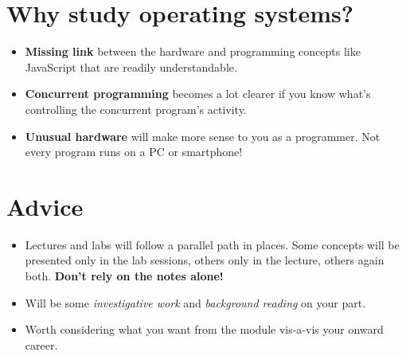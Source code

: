 \section{Why study operating systems?}
\label{sec:why-study-operating-systems}

\begin{itemize}

\item
  \textbf{Missing link} between the hardware and programming concepts
  like JavaScript that are readily understandable.
\item
  \textbf{Concurrent programming} becomes a lot clearer if you know
  what's controlling the concurrent program's activity.
\item
  \textbf{Unusual hardware} will make more sense to you as a programmer.
  Not every program runs on a PC or smartphone!
\end{itemize}

\section{Advice}
\label{sec:advice}

\begin{itemize}
\item
  Lectures and labs will follow a parallel path in places.
  Some concepts will be presented only in the lab sessions, others only in the lecture, others again both.
  \textbf{Don't rely on the notes alone!}
\item
  Will be some \emph{investigative work} and \emph{background reading} on your part.
\item
  Worth considering what you want from the module vis-a-vis your onward career.
\end{itemize}

